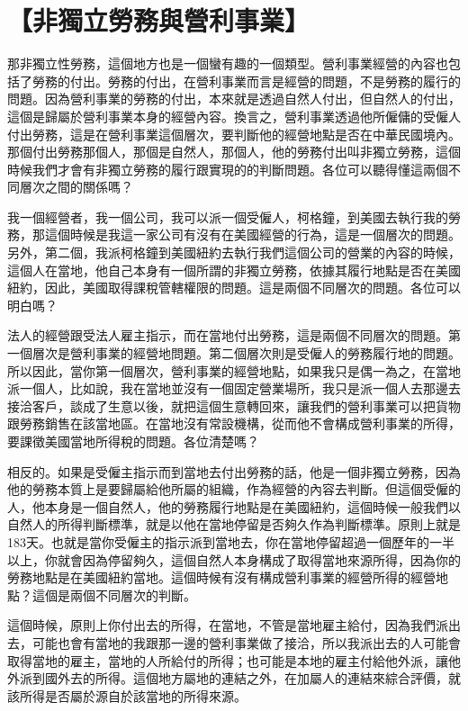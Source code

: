 \documentclass[]{ctexbook}
\begin{document}
\hypertarget{ux975eux7368ux7acbux52deux52d9ux8207ux71dfux5229ux4e8bux696d}{%
\section{【非獨立勞務與營利事業】}\label{ux975eux7368ux7acbux52deux52d9ux8207ux71dfux5229ux4e8bux696d}}

那非獨立性勞務，這個地方也是一個蠻有趣的一個類型。營利事業經營的內容也包括了勞務的付出。勞務的付出，在營利事業而言是經營的問題，不是勞務的履行的問題。因為營利事業的勞務的付出，本來就是透過自然人付出，但自然人的付出，這個是歸屬於營利事業本身的經營內容。換言之，營利事業透過他所僱傭的受僱人付出勞務，這是在營利事業這個層次，要判斷他的經營地點是否在中華民國境內。那個付出勞務那個人，那個是自然人，那個人，他的勞務付出叫非獨立勞務，這個時候我們才會有非獨立勞務的履行跟實現的的判斷問題。各位可以聽得懂這兩個不同層次之間的關係嗎？

我一個經營者，我一個公司，我可以派一個受僱人，柯格鐘，到美國去執行我的勞務，那這個時候是我這一家公司有沒有在美國經營的行為，這是一個層次的問題。另外，第二個，我派柯格鐘到美國紐約去執行我們這個公司的營業的內容的時候，這個人在當地，他自己本身有一個所謂的非獨立勞務，依據其履行地點是否在美國紐約，因此，美國取得課稅管轄權限的問題。這是兩個不同層次的問題。各位可以明白嗎？

法人的經營跟受法人雇主指示，而在當地付出勞務，這是兩個不同層次的問題。第一個層次是營利事業的經營地問題。第二個層次則是受僱人的勞務履行地的問題。所以因此，當你第一個層次，營利事業的經營地點，如果我只是偶一為之，在當地派一個人，比如說，我在當地並沒有一個固定營業場所，我只是派一個人去那邊去接洽客戶，談成了生意以後，就把這個生意轉回來，讓我們的營利事業可以把貨物跟勞務銷售在該當地區。在當地沒有常設機構，從而他不會構成營利事業的所得，要課徵美國當地所得稅的問題。各位清楚嗎？

相反的。如果是受僱主指示而到當地去付出勞務的話，他是一個非獨立勞務，因為他的勞務本質上是要歸屬給他所屬的組織，作為經營的內容去判斷。但這個受僱的人，他本身是一個自然人，他的勞務履行地點是在美國紐約，這個時候一般我們以自然人的所得判斷標準，就是以他在當地停留是否夠久作為判斷標準。原則上就是183天。也就是當你受僱主的指示派到當地去，你在當地停留超過一個歷年的一半以上，你就會因為停留夠久，這個自然人本身構成了取得當地來源所得，因為你的勞務地點是在美國紐約當地。這個時候有沒有構成營利事業的經營所得的經營地點？這個是兩個不同層次的判斷。

這個時候，原則上你付出去的所得，在當地，不管是當地雇主給付，因為我們派出去，可能也會有當地的我跟那一邊的營利事業做了接洽，所以我派出去的人可能會取得當地的雇主，當地的人所給付的所得；也可能是本地的雇主付給他外派，讓他外派到國外去的所得。這個地方屬地的連結之外，在加屬人的連結來綜合評價，就該所得是否屬於源自於該當地的所得來源。
\end{document}
